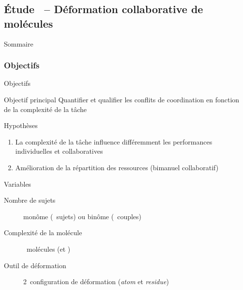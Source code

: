 \documentclass[english,french,dvips,10pt]{mybeamer}
\begin{document}
	\subsection{Étude~ -- Déformation collaborative de molécules}
	\begin{myframe}{Sommaire}
		\tableofcontents[sectionstyle=show/shaded,subsectionstyle=show/shaded/hide,subsubsectionstyle=show/show/hide]
	\end{myframe}
	\subsubsection{Objectifs}
	\begin{myframe}{Objectifs}
		\begin{myblock}{Objectif principal}
			Quantifier et qualifier les conflits de coordination en fonction de la complexité de la tâche
		\end{myblock}
		\begin{myplusblock}{Hypothèses}
			\begin{enumerate}
				\item La complexité de la tâche influence différemment les performances individuelles et collaboratives
				\item Amélioration de la répartition des ressources (bimanuel \myvs collaboratif)
			\end{enumerate}
		\end{myplusblock}
		\begin{myblock}{Variables}
			\begin{description}
				\item[Nombre de sujets] monôme (~sujets) ou binôme (~couples)
				\item[Complexité de la molécule] ~molécules (\myTRPZIPPER et \myTRPCAGE)
				\item[Outil de déformation] 2~configuration de déformation (\emph{atom} et \emph{residue})
			\end{description}
		\end{myblock}
	\end{myframe}
\end{document}
